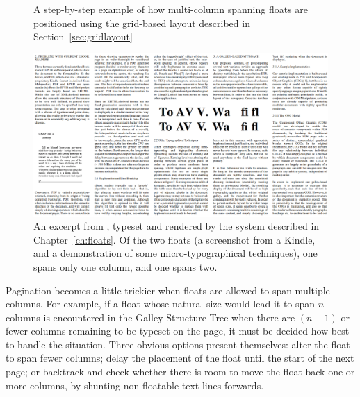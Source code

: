 \begin{figure}
    \caption[Step through of multi-column layout]{A step-by-step example of how multi-column spanning floats are positioned using the grid-based layout described in Section~\ref{sec:gridlayout}}
    \label{fig:floatlayout}
\end{figure}



\begin{figure}
    \includegraphics[angle=90,origin=c,width=\textwidth]{gfx/floatrendering}
    \caption[A sample rendering with multi-column floats]{An excerpt from \cite{Pinkney2011}, typeset and rendered by the system described in Chapter~\ref{ch:floats}. Of the two floats (a screenshot from a Kindle, and a demonstration of some micro-typographical techniques), one spans only one column, and one spans two. }
    \label{fig:screengrab}
\end{figure}


Pagination becomes a little trickier when floats are allowed to span multiple columns. For example, if a float whose natural size would lead it to span $n$ columns is encountered in the Galley Structure Tree when there are $(n-1)$ or fewer columns remaining to be typeset on the page, it must be decided how best to handle the situation. Three obvious options present themselves: alter the float to span fewer columns; delay the placement of the float until the start of the next page; or backtrack and check whether there is room to move the float back one or more columns, by shunting non-floatable text lines forwards.

